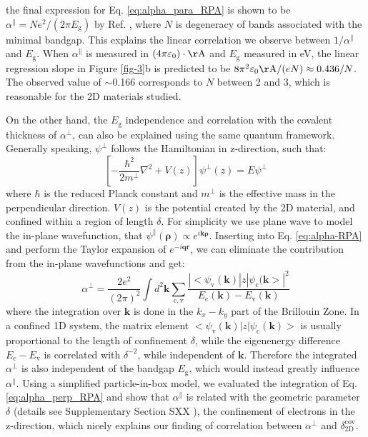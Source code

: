 \documentclass[journal=ancac3,manuscript=article,email=true,hyperref=true,keywords=false]{achemso}
\begin{document}
the final expression for Eq. \ref{eq:alpha_para_RPA} is shown to be
$\alpha^{\parallel} = N e^{2}/(2\pi E_{\mathrm{g}})$ by
Ref. , where $N$ is degeneracy of bands
associated with the minimal bandgap. This explains the linear
correlation we observe between $1/\alpha^{\parallel}$ and
$E_{\mathrm{g}}$. When $\alpha^{\parallel}$ is measured in
$(4 \pi \varepsilon_{0})\cdot \mathrm{\AA}$ and $E_{\mathrm{g}}$
measured in eV, the linear regression slope in Figure \ref{fig-3}b is
predicted to be
$8\pi^{2}\varepsilon_{0} \mathrm{\AA}/(eN) \approx 0.436/N$. The
observed value of $\sim$0.166 corresponds to $N$ between 2 and 3,
which is reasonable for the 2D materials studied.

On the other hand, the $E_{\mathrm{g}}$ independence and correlation
with the covalent thickness of $\alpha^{\perp}$, can also be explained
using the same quantum framework. Generally speaking, $\psi^{\perp}$
follows the Hamiltonian in z-direction, such that:
\begin{equation}
  \label{eq:Hamil-z}
  \left[-\frac{\hbar^{2}}{2 m^{\perp}}\nabla^{2} + V(z)\right] \psi^{\perp}(z) = E \psi^{\perp}
\end{equation}
where $\hbar$ is the reduced Planck constant and $m^{\perp}$ is the
effective mass in the perpendicular direction. $V(z)$ is the potential
created by the 2D material, and confined within a region of length
$\delta$. For simplicity we use plane wave to model the in-plane
wavefunction, that
$\psi^{\parallel}(\mathbf{\rho}) \propto
e^{i\mathbf{k\rho}}$. Inserting into Eq. \ref{eq:alpha-RPA} and
perform the Taylor expansion of $e^{-i\mathbf{qr}}$, we can eliminate
the contribution from the in-plane
wavefunctions\cite{davies_physics_1997} and get:
\begin{equation}
  \label{eq:alpha_perp_RPA}
  \alpha^{\perp} = \frac{2e^{2}}{(2 \pi) ^{2}} \int d^{2}\mathbf{k}
  \sum_{\mathrm{c, v}}
  \frac{|<\psi_{\mathrm{v}}(\mathbf{k})|z|\psi_{\mathrm{c}}(\mathbf{k}>|^{2}}
  {E_{\mathrm{c}}(\mathbf{k}) - E_{\mathrm{v}}(\mathbf{k})}
\end{equation}
where the integration over $\mathbf{k}$ is done in the $k_{x}-k_{y}$
part of the Brillouin Zone. In a confined 1D system, the matrix
element
$<\psi_{\mathrm{v}}(\mathbf{k})|z|\psi_{\mathrm{c}}(\mathbf{k})>$ is
usually proportional to the length of confinement $\delta$, while the
eigenenergy difference $E_{\mathrm{c}}-E_{\mathrm{v}}$ is correlated
with $\delta^{-2}$, while independent of
$\mathbf{k}$\cite{Benedict_1995}. Therefore the integrated
$\alpha^{\perp}$ is also independent of the bandgap $E_{\mathrm{g}}$,
which would instead greatly influence $\alpha^{\parallel}$. Using a
simplified particle-in-box model, we evaluated the integration of
Eq. \ref{eq:alpha_perp_RPA} and show that $\alpha^{\parallel}$ is
related with the geometric parameter $\delta$ (details see Supplementary Section SXX ), the confinement of
electrons in the z-direction, which nicely explains our finding of
correlation between $\alpha^{\perp}$ and
$\delta^{\mathrm{cov}}_{\mathrm{2D}}$.
\end{document}

